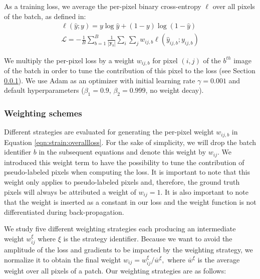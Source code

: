As a training loss, we average the per-pixel binary cross-entropy $\ell$ over all pixels of the batch, as defined in:
\begin{align}
\ell(\hat{y}; y) = y \log \hat{y} + (1 - y) \log (1 - \hat{y}) \label{eqn:strain:perpixel_crossentropy} \\
\mathcal{L} = - \frac{1}{B} \sum_{b=1}^B \frac{1}{|\mathbf{y}_b|}\sum_{i}\sum_{j} w_{ij, b} \ell(\hat{y}_{ij, b}; y_{ij,b }) 
\label{eqn:strain:overallloss}
\end{align}

We multiply the per-pixel loss by a weight $w_{ij, b}$ for pixel $(i, j)$ of the $b^{th}$ image of the batch in order to tune the contribution of this pixel to the loss (see Section \ref{sssec:strain:weights}).
We use Adam \cite{kingma2014adam} as an optimizer with initial learning rate $\gamma= 0.001$ and default hyperparameters ($\beta_1 = 0.9$, $\beta_2 = 0.999$, no weight decay).


\subsubsection{Weighting schemes}
\label{sssec:strain:weights}

Different strategies are evaluated for generating the per-pixel weight $w_{ij,b}$ in Equation \ref{eqn:strain:overallloss}. For the sake of simplicity, we will drop the batch identifier $b$ in the subsequent equations and denote this weight by $w_{ij}$. We introduced this weight term to have the possibility to tune the contribution of pseudo-labeled pixels when computing the loss. It is important to note that this weight only applies to pseudo-labeled pixels and, therefore, the ground truth pixels will always be attributed a weight of $w_{ij} = 1$. It is also important to note that the weight is inserted as a constant in our loss and the weight function is not differentiated during back-propagation. 

We study five different weighting strategies each producing an intermediate weight $w^{\xi}_{ij}$ where $\xi$ is the strategy identifier. Because we want to avoid the amplitude of the loss and gradients to be impacted by the weighting strategy, we normalize it to obtain the final weight $w_{ij} = w^{\xi}_{ij}/\overline{w}^{\xi},$
where $\overline{w}^{\xi}$ is the average weight over all pixels of a patch. Our weighting strategies are as follows:

